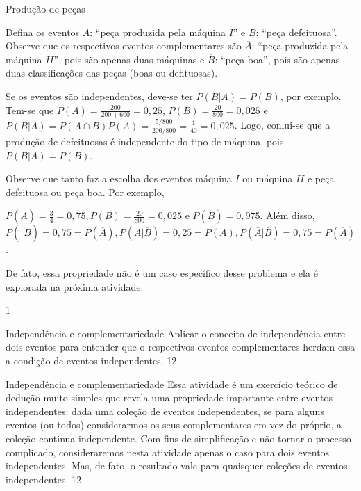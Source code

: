 \begin{answer}{Produção de peças}
{
Defina os eventos $A$: “peça produzida pela máquina $I”$ e $B$: “peça defeituosa”. Observe que os respectivos eventos complementares são $\overline{A}$: “peça produzida pela máquina $II$”, pois são apenas duas máquinas e $\overline{B}$: “peça boa”, pois são apenas duas classificações das peças (boas ou defituosas).

Se os eventos são independentes, deve-se ter $P(B|A)=P(B)$, por exemplo. Tem-se que $P(A)=\frac{200}{200+600}=0{,}25$, $P(B)=\frac{20}{800}=0{,}025$ e $P(B|A)=P(A\cap B)P(A)=\frac{5/800}{200/800}=\frac{1}{40}=0{,}025$. Logo, conlui-se que a produção de defeituosas é independente do tipo de máquina, pois $P(B|A)=P(B)$.

Observe que tanto faz a escolha dos eventos máquina $I$ ou máquina $II$ e peça defeituosa ou peça boa. Por exemplo,

$P(\overline{A})=\frac{3}{4}=0{,}75, P(B)=\frac{20}{800}=0{,}025$ e $P(\overline{B})=0{,}975$. Além disso, $P(\overline|B)=0{,}75=P(\overline{A}), P(A|\overline{B})=0{,}25=P(A), P(\overline{A}|\overline{B})=0{,}75=P(\overline{A})$.

De fato, essa propriedade não é um caso específico desse problema e ela é explorada na próxima atividade.
}{1}
\end{answer}
\begin{objectives}{Independência e complementariedade}
{
Aplicar o conceito de independência entre dois eventos para entender que o respectivos eventos complementares herdam essa a condição de eventos independentes.
}{1}{2}
\end{objectives}
\begin{sugestions}{Independência e complementariedade}
{
Essa atividade é um exercício teórico de dedução muito simples que revela uma propriedade importante entre eventos independentes: dada uma coleção de eventos independentes, se para alguns eventos (ou todos) considerarmos os seus complementares em vez do próprio, a coleção continua independente. Com fins de simplificação e não tornar o processo complicado, consideraremos nesta atividade apenas o caso para dois eventos independentes. Mas, de fato, o resultado vale para quaisquer coleções de eventos independentes.
}{1}{2}
\end{sugestions}
